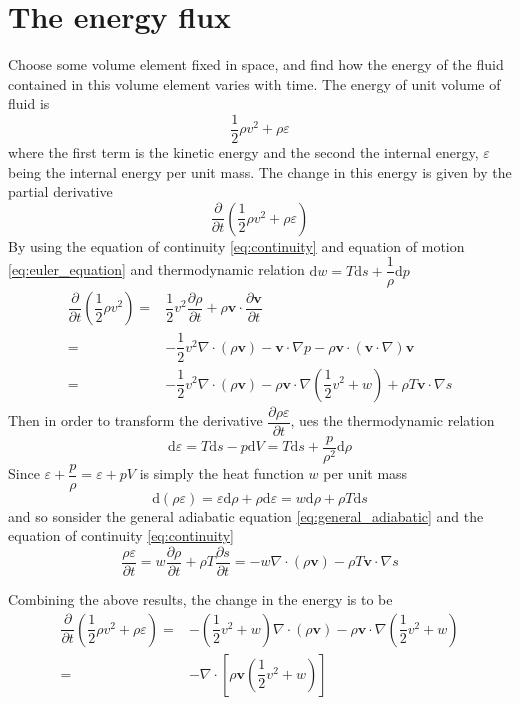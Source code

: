 \documentclass[conference]{IEEEtran}
\theoremstyle{definition}
\theoremstyle{remark}
\begin{document}
    \section{The energy flux}
    Choose some volume element fixed in space, and find how the energy of the fluid contained in this volume element varies with time. The energy of unit volume of fluid is
    \[
        \dfrac12 \rho v^2 + \rho \varepsilon
    \]
    where the first term is the kinetic energy and the second the internal energy, $\varepsilon$ being the internal energy per unit mass. The change in this energy is given by the partial derivative
    \[
        \dfrac{\partial }{\partial t} \left(\dfrac12 \rho v^2 + \rho \varepsilon \right)
    \]
    By using the equation of continuity \ref{eq:continuity} and equation of motion \ref{eq:euler_equation} and thermodynamic relation $\mathrm{d} w = T \mathrm{d} s + \dfrac1\rho \mathrm{d} p$
    \begin{align*}
        \dfrac{\partial}{\partial t} \left( \dfrac12 \rho v^2 \right) =& \dfrac12 v^2 \dfrac{\partial \rho}{\partial t} + \rho \mathbf{v} \cdot \dfrac{\partial \mathbf{v}}{\partial t} \\
        =& -\dfrac12 v^2 \nabla \cdot (\rho \mathbf{v}) - \mathbf{v} \cdot \nabla p - \rho \mathbf{v} \cdot (\mathbf{v} \cdot \nabla) \mathbf{v} \\
        =& -\dfrac12 v^2 \nabla \cdot (\rho \mathbf{v}) - \rho \mathbf{v} \cdot \nabla (\dfrac12 v^2 + w) + \rho T \mathbf{v} \cdot \nabla s
    \end{align*}
    Then in order to transform the derivative $\dfrac{\partial \rho \varepsilon}{\partial t}$, ues the thermodynamic relation
    \[
        \mathrm{d} \varepsilon = T \mathrm{d} s - p \mathrm{d} V = T \mathrm{d} s + \dfrac{p}{\rho^2} \mathrm{d} \rho
    \]
    Since $\varepsilon + \dfrac{p}{\rho} = \varepsilon + p V$ is simply the heat function $w$ per unit mass
    \[
        \mathrm{d} (\rho \varepsilon) = \varepsilon \mathrm{d} \rho + \rho \mathrm{d} \varepsilon = w \mathrm{d} \rho + \rho T \mathrm{d} s
    \]
    and so sonsider the general adiabatic equation \ref{eq:general_adiabatic} and the equation of continuity \ref{eq:continuity}
    \[
        \dfrac{\rho \varepsilon}{\partial t} =  w \dfrac{\partial \rho}{\partial t} + \rho T \dfrac{\partial s}{\partial t} = -w \nabla \cdot (\rho \mathbf{v}) - \rho T \mathbf{v} \cdot \nabla s
    \]

    Combining the above results, the change in the energy is to be
    \begin{align*}
        \dfrac{\partial}{\partial t} \left( \dfrac12 \rho v^2 + \rho \varepsilon \right) =& -\left( \dfrac12 v^2 + w \right) \nabla \cdot (\rho \mathbf{v}) - \rho \mathbf{v} \cdot \nabla \left( \dfrac{1}{2}v^2 + w \right) \\
        =& - \nabla \cdot \left[ \rho \mathbf{v} \left( \dfrac12 v^2 + w \right) \right]
    \end{align*}
\end{document}
